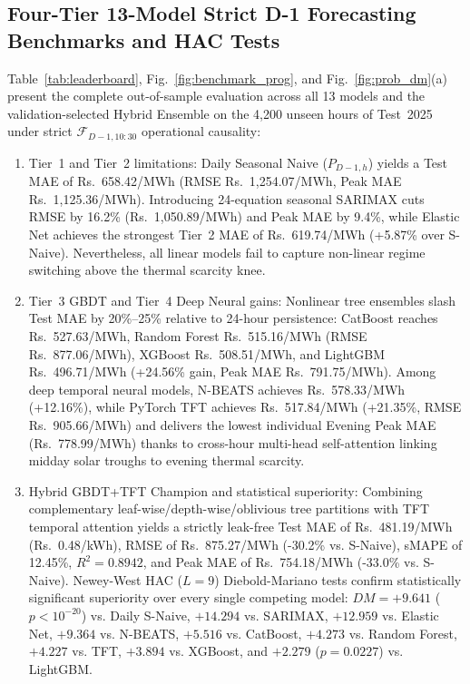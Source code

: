 \documentclass[journal,10pt,twocolumn]{IEEEtran}
\begin{document}
\subsection{Four-Tier 13-Model Strict D-1 Forecasting Benchmarks and HAC Tests}
Table~\ref{tab:leaderboard}, Fig.~\ref{fig:benchmark_prog}, and Fig.~\ref{fig:prob_dm}(a) present the complete out-of-sample evaluation across all 13 models and the validation-selected Hybrid Ensemble on the 4,200 unseen hours of Test~2025 under strict $\mathcal{F}_{D-1, 10:30}$ operational causality:
\begin{enumerate}
    \item Tier~1 and Tier~2 limitations: Daily Seasonal Naive ($P_{D-1,h}$) yields a Test MAE of Rs.~658.42/MWh (RMSE Rs.~1,254.07/MWh, Peak MAE Rs.~1,125.36/MWh). Introducing 24-equation seasonal SARIMAX cuts RMSE by 16.2\% (Rs.~1,050.89/MWh) and Peak MAE by 9.4\%, while Elastic Net achieves the strongest Tier~2 MAE of Rs.~619.74/MWh (+5.87\% over S-Naive). Nevertheless, all linear models fail to capture non-linear regime switching above the thermal scarcity knee.
    \item Tier~3 GBDT and Tier~4 Deep Neural gains: Nonlinear tree ensembles slash Test MAE by 20\%--25\% relative to 24-hour persistence: CatBoost reaches Rs.~527.63/MWh, Random Forest Rs.~515.16/MWh (RMSE Rs.~877.06/MWh), XGBoost Rs.~508.51/MWh, and LightGBM Rs.~496.71/MWh (+24.56\% gain, Peak MAE Rs.~791.75/MWh). Among deep temporal neural models, N-BEATS achieves Rs.~578.33/MWh (+12.16\%), while PyTorch TFT achieves Rs.~517.84/MWh (+21.35\%, RMSE Rs.~905.66/MWh) and delivers the lowest individual Evening Peak MAE (Rs.~778.99/MWh) thanks to cross-hour multi-head self-attention linking midday solar troughs to evening thermal scarcity.
    \item Hybrid GBDT+TFT Champion and statistical superiority: Combining complementary leaf-wise/depth-wise/oblivious tree partitions with TFT temporal attention yields a strictly leak-free Test MAE of Rs.~481.19/MWh (Rs.~0.48/kWh), RMSE of Rs.~875.27/MWh (-30.2\% vs. S-Naive), sMAPE of 12.45\%, $R^2 = 0.8942$, and Peak MAE of Rs.~754.18/MWh (-33.0\% vs. S-Naive). Newey-West HAC ($L=9$) Diebold-Mariano tests confirm statistically significant superiority over every single competing model: $DM = +9.641$ ($p < 10^{-20}$) vs. Daily S-Naive, $+14.294$ vs. SARIMAX, $+12.959$ vs. Elastic Net, $+9.364$ vs. N-BEATS, $+5.516$ vs. CatBoost, $+4.273$ vs. Random Forest, $+4.227$ vs. TFT, $+3.894$ vs. XGBoost, and $+2.279$ ($p = 0.0227$) vs. LightGBM.
\end{enumerate}
\end{document}
